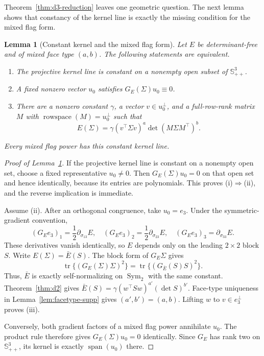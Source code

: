 \documentclass[12pt,a4paper]{article}
\theoremstyle{plain}
\newtheorem{lemma}{Lemma}
\theoremstyle{definition}
\newcommand{\Smat}{\mathbb{S}}
\newcommand{\Sym}{\operatorname{Sym}}
\newcommand{\tr}{\operatorname{tr}}
\newcommand{\Span}{\operatorname{span}}
\newcommand{\rowspace}{\operatorname{rowspace}}
\begin{document}
Theorem~\ref{thm:d3-reduction} leaves one geometric question.
The next lemma shows that constancy of the kernel line is exactly the missing condition for the mixed flag form.

\begin{lemma}[Constant kernel and the mixed flag form]
\label{lem:constant-kernel}
    Let $E$ be determinant-free and of mixed face type $(a,b)$.
    The following statements are equivalent.
    \begin{enumerate}
        \item[(i)] The projective kernel line is constant on a nonempty open subset of $\Smat^3_{++}$.
        \item[(ii)] A fixed nonzero vector $u_0$ satisfies $G_E(\Sigma)u_0\equiv0$.
        \item[(iii)] There are a nonzero constant $\gamma$, a vector $v\in u_0^\perp$, and a full-row-rank matrix $M$ with $\rowspace(M)=u_0^\perp$ such that
        \begin{equation*}
            E(\Sigma)
            =
            \gamma(v^\top\Sigma v)^a\det(M\Sigma M^\top)^b
            .
        \end{equation*}
    \end{enumerate}
    Every mixed flag power has this constant kernel line.
\end{lemma}

\begin{proof}[Proof of Lemma~\ref{lem:constant-kernel}]
    If the projective kernel line is constant on a nonempty open set, choose a fixed representative $u_0\ne0$.
    Then $G_E(\Sigma)u_0=0$ on that open set and hence identically, because its entries are polynomials.
    This proves (i)$\Rightarrow$(ii), and the reverse implication is immediate.

    Assume (ii).
    After an orthogonal congruence, take $u_0=e_3$.
    Under the symmetric-gradient convention,
    \begin{equation*}
        (G_Ee_3)_1=\frac{1}{2}\partial_{\sigma_{13}}E
        ,
        \quad
        (G_Ee_3)_2=\frac{1}{2}\partial_{\sigma_{23}}E
        ,
        \quad
        (G_Ee_3)_3=\partial_{\sigma_{33}}E
        .
    \end{equation*}
    These derivatives vanish identically, so $E$ depends only on the leading $2\times2$ block $S$.
    Write $E(\Sigma)=\bar E(S)$.
    The block form of $G_E\Sigma$ gives
    \begin{equation*}
        \tr\{(G_E(\Sigma)\Sigma)^2\}=\tr\{(G_{\bar E}(S)S)^2\}
        .
    \end{equation*}
    Thus, $\bar E$ is exactly self-normalizing on $\Sym_2$ with the same constant.
    Theorem~\ref{thm:d2} gives $\bar E(S)=\gamma(w^\top Sw)^{a'}(\det S)^{b'}$.
    Face-type uniqueness in Lemma~\ref{lem:facetype-supp} gives $(a',b')=(a,b)$.
    Lifting $w$ to $v\in e_3^\perp$ proves (iii).

    Conversely, both gradient factors of a mixed flag power annihilate $u_0$.
    The product rule therefore gives $G_E(\Sigma)u_0=0$ identically.
    Since $G_E$ has rank two on $\Smat^3_{++}$, its kernel is exactly $\Span(u_0)$ there.
\end{proof}
\end{document}
